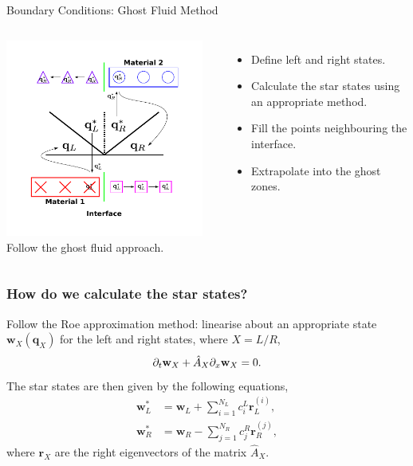 \documentclass{beamer}
\begin{document}
\begin{frame}{Boundary Conditions: Ghost Fluid Method}
\begin{columns}
\column{6.5cm}
\centering
\includegraphics[width=6.5cm]{../images/multimodel_roe}
\column{4.5cm}
Follow the ghost fluid approach.
\begin{itemize}
\item{Define left and right states.}
\item{Calculate the star states using an appropriate method.}
\item{Fill the points neighbouring the interface.}
\item{Extrapolate into the ghost zones.}
\end{itemize}
\end{columns}
\end{frame}

\begin{frame}
\frametitle{How do we calculate the star states?}
Follow the Roe approximation method: linearise about an appropriate state $\mathbf{w}_X(\mathbf{q}_X)$ for the left and right states, where $X = L/R$,
\begin{equation}
\partial_t\mathbf{w}_X + \hat{A}_X\partial_{\mathnormal{x}}\mathbf{w}_X = 0.
\end{equation}
The star states are then given by the following equations,
\begin{align}
\mathbf{w}^*_L &= \mathbf{w}_L+\sum^{N_L}_{i=1}c^L_{i}\mathbf{r}^{(i)}_L,\\
\mathbf{w}^*_R &= \mathbf{w}_R-\sum^{N_R}_{j=1}c^R_{j}\mathbf{r}^{(j)}_R,
\end{align}
where $\mathbf{r}_X$ are the right eigenvectors of the matrix $\hat{A}_X$.
\end{frame}
\end{document}
